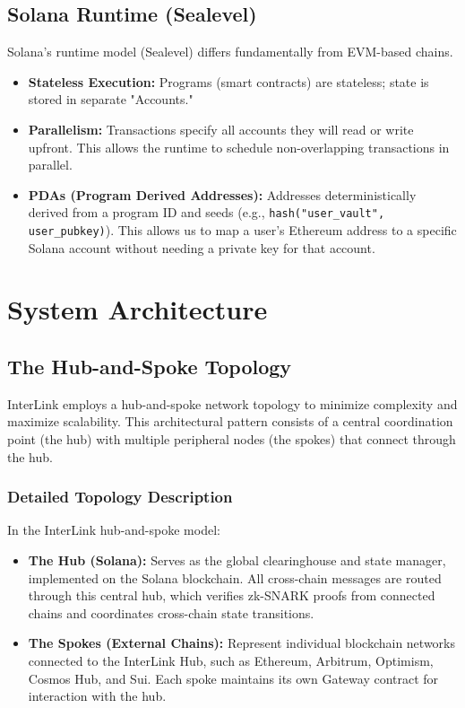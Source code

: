 \documentclass[11pt,a4paper]{article}
\begin{document}
\subsection{Solana Runtime (Sealevel)}
Solana's runtime model (Sealevel) differs fundamentally from EVM-based chains.
\begin{itemize}
    \item \textbf{Stateless Execution:} Programs (smart contracts) are stateless; state is stored in separate "Accounts."
    \item \textbf{Parallelism:} Transactions specify all accounts they will read or write upfront. This allows the runtime to schedule non-overlapping transactions in parallel.
    \item \textbf{PDAs (Program Derived Addresses):} Addresses deterministically derived from a program ID and seeds (e.g., \texttt{hash("user\_vault", user\_pubkey)}). This allows us to map a user's Ethereum address to a specific Solana account without needing a private key for that account.
\end{itemize}

\section{System Architecture}
\label{sec:arch}

\subsection{The Hub-and-Spoke Topology}

InterLink employs a hub-and-spoke network topology to minimize complexity and maximize scalability. This architectural pattern consists of a central coordination point (the hub) with multiple peripheral nodes (the spokes) that connect through the hub.

\subsubsection{Detailed Topology Description}
In the InterLink hub-and-spoke model:
\begin{itemize}
    \item \textbf{The Hub (Solana):} Serves as the global clearinghouse and state manager, implemented on the Solana blockchain. All cross-chain messages are routed through this central hub, which verifies zk-SNARK proofs from connected chains and coordinates cross-chain state transitions.
    \item \textbf{The Spokes (External Chains):} Represent individual blockchain networks connected to the InterLink Hub, such as Ethereum, Arbitrum, Optimism, Cosmos Hub, and Sui. Each spoke maintains its own Gateway contract for interaction with the hub.
\end{itemize}
\end{document}
